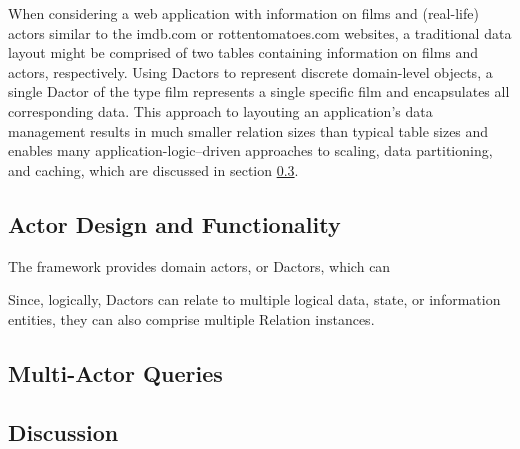 When considering a web application with information on films and (real-life) actors similar to the imdb.com or rottentomatoes.com websites, a traditional data layout might be comprised of two tables containing information on films and actors, respectively.
Using Dactors to represent discrete domain-level objects, a single Dactor of the type film represents a single specific film and encapsulates all corresponding data.
This approach to layouting an application's data management results in much smaller relation sizes than typical table sizes and enables many application-logic--driven approaches to scaling, data partitioning, and caching, which are discussed in section \ref{subsec:discussion}.

\subsection{Actor Design and Functionality}

The framework provides domain actors, or Dactors, which can 

Since, logically, Dactors can relate to multiple logical data, state, or information entities, they can also comprise multiple Relation instances.

\subsection{Multi-Actor Queries}


\subsection{Discussion}\label{subsec:discussion}
